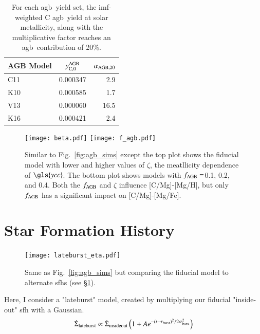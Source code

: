 \documentclass[12pt,oneside,letterpaper]{report}
\newcommand{\agb}{\gls{agb}}
\newcommand{\sfh}{\gls{sfh}}
\newcommand{\imf}{\gls{imf}}
\newcommand{\Ycc}{\gls{ycc}}
\newcommand{\caah}{[C/Mg]-[Mg/H]}
\newcommand{\caafe}{[C/Mg]-[Mg/Fe]}
\begin{document}
\begin{table}
	\centering
    \caption[Low mass star solar C yields]{For each \agb\ yield set, the \imf-weighted C \agb\ yield at solar metallicity, along with the multiplicative factor reaches an \agb\ contribution of 20\%.}
	\label{tab:alpha_agb}
	\begin{tabular}{lcr} %
		\toprule 
		AGB Model & $y_{\rm C, 0}^{\rm AGB}$ & $\alpha_{\rm AGB, 20}$\\
        \midrule
		C11 & 0.000347 & 2.9\\
		K10 & 0.000585 & 1.7\\
		V13 & 0.000060 & 16.5\\
		K16 & 0.000421 & 2.4\\
		\bottomrule
	\end{tabular}
\end{table}


\begin{figure}
\centering
\texttt{[image: beta.pdf]}
\texttt{[image: f\_agb.pdf]}

\caption[Adjusted yield models]{Similar to Fig.~\ref{fig:agb_sims} except the top plot shows the fiducial model with lower and higher values of $\zeta$, the meatllicity dependence of $\Ycc$. The bottom plot shows models with $f_{\rm AGB}=$0.1, 0.2, and 0.4. Both the $f_{\rm AGB}$ and $\zeta$ influence \caah, but only $f_{\rm AGB}$ has a significant impact on \caafe.}
\label{fig:beta_f}
\end{figure}



\section{Star Formation History} \label{sec:sfh}


\begin{figure}
\centering
\texttt{[image: lateburst\_eta.pdf]}

\caption[Lateburst models]{Same as Fig.~\ref{fig:agb_sims} but comparing the fiducial model to alternate \sfh{}s (see \S \ref{sec:sfh}).}
\label{fig:sfh_models}

\end{figure}


Here, I consider a "lateburst" model, created by multiplying our fiducial "inside-out" \sfh{} with a Gaussian.
\begin{equation}\label{eq:lateburst}
    \dot{\Sigma}_{\rm lateburst} \propto \dot{\Sigma}_{\rm insideout} \left(1 + A e^{-(t-\tau_{\rm burst})^2/2\sigma^2_{\rm burst}} \right)
\end{equation}
\end{document}
